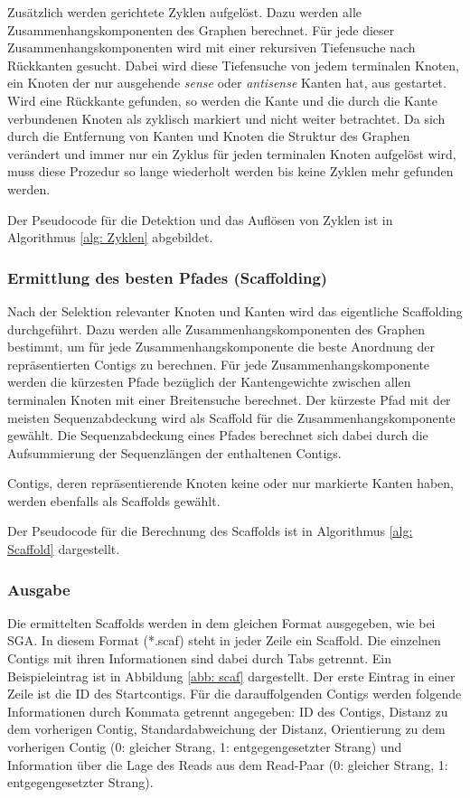 \documentclass[a4paper,11pt,parskip,abstract=on]{scrartcl}
\begin{document}
Zusätzlich werden gerichtete Zyklen aufgelöst. Dazu werden alle
Zusammenhangskomponenten des Graphen berechnet. Für jede dieser
Zusammenhangskomponenten wird mit einer rekursiven Tiefensuche nach
Rückkanten gesucht. Dabei wird diese Tiefensuche von jedem terminalen
Knoten, ein Knoten der nur ausgehende \textit{sense} oder
\textit{antisense} Kanten hat, aus gestartet. Wird eine Rückkante
gefunden, so werden die Kante und die durch die Kante verbundenen
Knoten als zyklisch markiert und nicht weiter betrachtet. Da sich
durch die Entfernung von Kanten und Knoten die Struktur des Graphen
verändert und immer nur ein Zyklus für jeden terminalen Knoten
aufgelöst wird, muss diese Prozedur so lange wiederholt werden bis
keine Zyklen mehr gefunden werden.

Der Pseudocode für die Detektion und das Auflösen von Zyklen ist in
Algorithmus \ref{alg: Zyklen} abgebildet.

\subsubsection{Ermittlung des besten Pfades (Scaffolding)}

Nach der Selektion relevanter Knoten und Kanten wird das eigentliche
Scaffolding durchgeführt. Dazu werden alle Zusammenhangskomponenten
des Graphen bestimmt, um für jede Zusammenhangskomponente die beste
Anordnung der repräsentierten Contigs zu berechnen. Für jede
Zusammenhangskomponente werden die kürzesten Pfade bezüglich der
Kantengewichte zwischen allen terminalen Knoten mit einer Breitensuche
berechnet. Der kürzeste Pfad mit der meisten Sequenzabdeckung wird als
Scaffold für die Zusammenhangskomponente gewählt. Die Sequenzabdeckung
eines Pfades berechnet sich dabei durch die Aufsummierung der
Sequenzlängen der enthaltenen Contigs.

Contigs, deren repräsentierende Knoten keine oder nur markierte Kanten
haben, werden ebenfalls als Scaffolds gewählt.

Der Pseudocode für die Berechnung des Scaffolds ist in Algorithmus
\ref{alg: Scaffold} dargestellt.

\subsubsection{Ausgabe}
Die ermittelten Scaffolds werden in dem gleichen Format ausgegeben,
wie bei SGA. In diesem Format (*.scaf) steht in jeder Zeile
ein Scaffold. Die einzelnen Contigs mit ihren Informationen sind dabei
durch Tabs getrennt. Ein Beispieleintrag ist in Abbildung \ref{abb:
  scaf} dargestellt. Der erste Eintrag in einer Zeile ist die ID des
Startcontigs. Für die darauffolgenden Contigs werden folgende
Informationen durch Kommata getrennt angegeben: ID des Contigs, Distanz
zu dem vorherigen Contig, Standardabweichung der Distanz, Orientierung
zu dem vorherigen Contig (0: gleicher Strang, 1: entgegengesetzter
Strang) und Information über die Lage des Reads aus dem Read-Paar (0:
gleicher Strang, 1: entgegengesetzter Strang).
\end{document}
